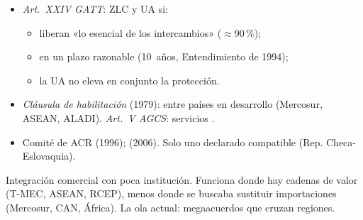 \documentclass{article}
\begin{document}
\begin{columnas}
\begin{itemize}
\item \emph{Art.~XXIV GATT}: ZLC y UA si:
  \begin{itemize}
  \item liberan «lo esencial de los intercambios» ($\approx$90\,\%);
  \item en un plazo razonable (10~años, Entendimiento de 1994);
  \item la UA no eleva en conjunto la protección.
  \end{itemize}
\item \emph{Cláusula de habilitación} (1979): entre países en desarrollo (Mercosur, ASEAN, ALADI). \emph{Art.~V AGCS}: servicios .
\item Comité de ACR (1996);  (2006). Solo uno declarado compatible (Rep. Checa-Eslovaquia).
\end{itemize}

\begin{ideaclave}
Integración comercial con poca institución. Funciona donde hay cadenas de valor (T-MEC, ASEAN, RCEP), menos donde se buscaba sustituir importaciones (Mercosur, CAN, África). La ola actual: megaacuerdos que cruzan regiones.
\end{ideaclave}


\end{columnas}
\end{document}
